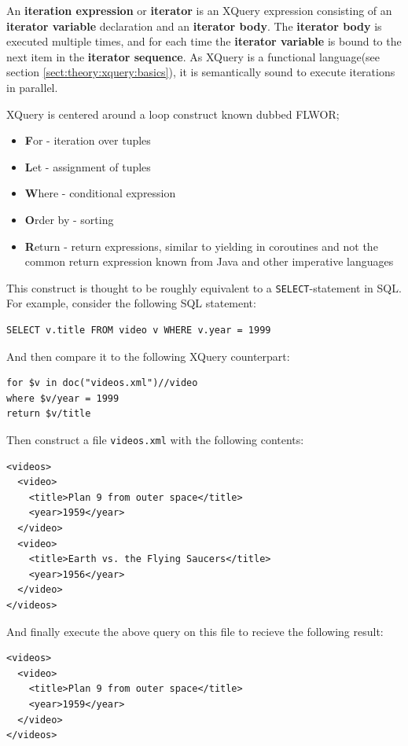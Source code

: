 \begin{myDefinition}
\label{definition:iteration_expression}
An \textbf{iteration expression} or \textbf{iterator} is an XQuery expression consisting of an \textbf{iterator
variable} declaration and an \textbf{iterator body}. The \textbf{iterator body} is executed multiple times, and
for each time the \textbf{iterator variable} is bound to the next item in the \textbf{iterator sequence}. As
XQuery is a functional language(see section \ref{sect:theory:xquery:basics}), it is semantically sound to execute
iterations in parallel.
\end{myDefinition}

XQuery is centered around a loop construct known dubbed FLWOR;
\begin{itemize}
  \item \textbf{F}or - iteration over tuples
  \item \textbf{L}et - assignment of tuples
  \item \textbf{W}here - conditional expression
  \item \textbf{O}rder by - sorting 
  \item \textbf{R}eturn - return expressions, similar to yielding in coroutines
  and not the common return expression known from Java and other imperative
  languages
\end{itemize}
This construct is thought to be roughly equivalent to a
\texttt{SELECT}-statement in SQL. For example, consider the following SQL
statement: 
\begin{Verbatim}
SELECT v.title FROM video v WHERE v.year = 1999
\end{Verbatim}
And then compare it to the following XQuery counterpart:
\begin{Verbatim}
for $v in doc("videos.xml")//video
where $v/year = 1999
return $v/title
\end{Verbatim}
Then construct a file \texttt{videos.xml} with the following contents:
\begin{Verbatim}
<videos>
  <video>
    <title>Plan 9 from outer space</title>
    <year>1959</year>
  </video>
  <video>
    <title>Earth vs. the Flying Saucers</title>
    <year>1956</year>
  </video>
</videos>
\end{Verbatim}
And finally execute the above query on this file to recieve the following
result:
\begin{Verbatim}
<videos>
  <video>
    <title>Plan 9 from outer space</title>
    <year>1959</year>
  </video>
</videos>
\end{Verbatim}

